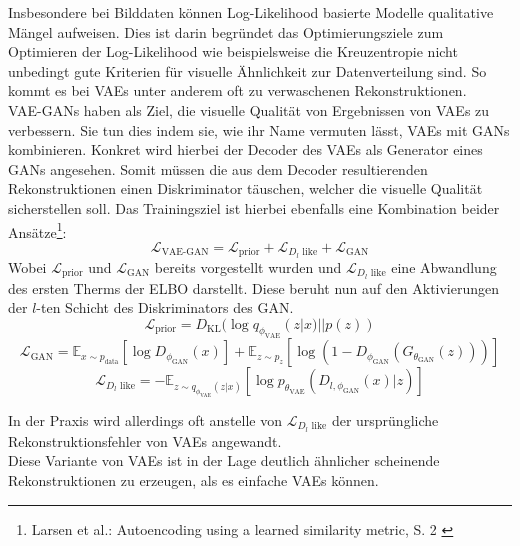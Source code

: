 Insbesondere bei Bilddaten können Log-Likelihood basierte Modelle qualitative Mängel aufweisen. Dies ist darin begründet das Optimierungsziele zum Optimieren der Log-Likelihood wie beispielsweise die Kreuzentropie nicht unbedingt gute Kriterien für visuelle Ähnlichkeit zur Datenverteilung sind. So kommt es bei VAEs unter anderem oft zu verwaschenen Rekonstruktionen. \\
VAE-GANs haben als Ziel, die visuelle Qualität von Ergebnissen von VAEs zu verbessern. Sie tun dies indem sie, wie ihr Name vermuten lässt, VAEs mit GANs kombinieren. Konkret wird hierbei der Decoder des VAEs als Generator eines GANs angesehen. Somit müssen die aus dem Decoder resultierenden Rekonstruktionen einen Diskriminator täuschen, welcher die visuelle Qualität sicherstellen soll. Das Trainingsziel ist hierbei ebenfalls eine Kombination beider Ansätze\footnote{
    Larsen et al.: Autoencoding using a learned similarity metric, S. 2
    \cite{larsen2016autoencoding}
}:
\begin{equation}
    \mathcal L_\text{VAE-GAN}
    = \mathcal L_\text{prior} + \mathcal L_{D_l\text{ like}} + \mathcal L_\text{GAN}
\end{equation}
Wobei $\mathcal L_\text{prior}$ und $\mathcal L_\text{GAN}$ bereits vorgestellt wurden und $\mathcal L_{D_l\text{ like}}$ eine Abwandlung des ersten Therms der ELBO darstellt. Diese beruht nun auf den Aktivierungen der $l$-ten Schicht des Diskriminators des GAN. 
\begin{equation}
    \mathcal L_\text{prior} 
    = D_\text{KL} (\log q_{\phi_\text{VAE}}(z|x) || p(z))
\end{equation}
\begin{equation}
    \mathcal L_\text{GAN} = \mathbb E_{x \sim p_\text{data}}[\log D_{\phi_\text{GAN}}(x)] 
    + \mathbb E_{z \sim p_z}
    [\log (1 - D_{\phi_\text{GAN}}(G_{\theta_\text{GAN}}(z)))]
\end{equation}
\begin{equation}
    \mathcal L_{D_l\text{ like}} = 
    - \mathbb E_{z \sim q_{\phi_\text{VAE}}(z|x)}
    \left [
        \log p_{\theta_\text{VAE}}(D_{l, \phi_\text{GAN}}(x)|z)
    \right ]
\end{equation}

In der Praxis wird allerdings oft anstelle von $\mathcal L_{D_l\text{ like}}$ der ursprüngliche Rekonstruktionsfehler von VAEs angewandt. \\
Diese Variante von VAEs ist in der Lage deutlich ähnlicher scheinende Rekonstruktionen zu erzeugen, als es einfache VAEs können.


